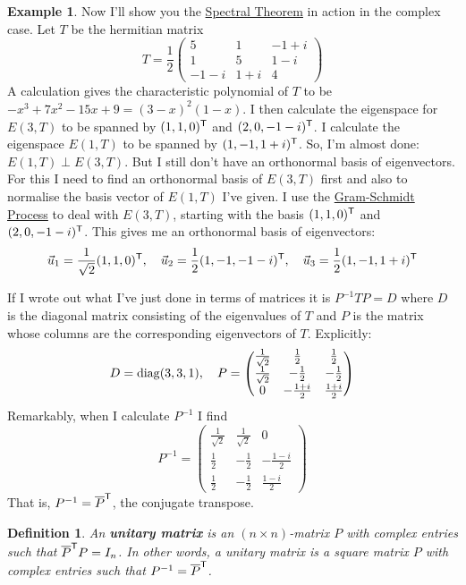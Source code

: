\documentclass[11pt]{amsbook}
\newtheorem{definition}[theorem]{Definition}
\theoremstyle{definition}
\newtheorem{ex}[theorem]{Example}
\begin{document}
\begin{ex} Now I'll show you the \hyperref[spectral]{Spectral Theorem} in action in the complex case. Let $T$ be the hermitian matrix $$T = \frac{1}{2} \begin{pmatrix} 5  & 1 & -1 + i \\ 1 & {5}  & 1 - i \\ -1 - i & 1+i & 4 \end{pmatrix} $$ A calculation gives the characteristic polynomial of $T$ to be $- x^3 + 7x^2 - 15x + 9 = (3-x)^2(1-x)$.  I then calculate the eigenspace for $E(3,T)$ to be spanned by $(1,1,0)^{\sf T}$ and $(2,0,-1-i)^{\sf T}$. I calculate the eigenspace $E(1,T)$ to be spanned by $( 1,-1,1+i)^{\sf T}$. So, I'm almost done: $E(1,T)\perp E(3,T)$. But I still don't have an orthonormal basis of eigenvectors. For this I need to find an orthonormal basis of $E(3,T)$ first and also to normalise the basis vector of $E(1,T)$ I've given. I use the \hyperref[GS]{Gram-Schmidt Process} to deal with $E(3,T)$, starting with the basis $(1,1,0)^{\sf T}$ and $(2,0,-1-i)^{\sf T}$. This gives me an orthonormal basis of eigenvectors: $$\vec{u}_1 = \frac{1}{\sqrt{2}}(1,1,0)^{\sf T}, \quad \vec{u}_2 = \frac{1}{2}(1,-1,-1-i)^{\sf T}, \quad \vec{u}_3 = \frac{1}{2}(1,-1,1+i)^{\sf T}$$

If I wrote out what I've just done in terms of matrices it is $P^{-1}TP = D$ where $D$ is the diagonal matrix consisting of the eigenvalues of $T$ and $P$ is the matrix whose columns are the corresponding eigenvectors of $T$. Explicitly: $$ D = {\rm diag}(3,3,1), \quad P = \begin{pmatrix} \frac{1}{\sqrt{2}} & \frac{1}{2} & \frac{1}{2} \\ \frac{1}{\sqrt{2}} & -\frac{1}{2} & -\frac{1}{2} \\ 0 & -\frac{1+i}{2} & \frac{ 1+i}{2}\end{pmatrix} $$
Remarkably, when I calculate $P^{-1}$ I find $$  P^{-1} = \begin{pmatrix} \frac{1}{\sqrt{2}} & \frac{1}{\sqrt{2}} & 0 \\ \frac{1}{2} & - \frac{1}{{2}} & -\frac{1-i}{2} \\ \frac{1}{2} & -\frac{1}{2} & \frac{ 1-i}{2} \end{pmatrix} $$  That is, $P^{-1} = \overline{P}^{\sf T}$, the conjugate transpose.
\end{ex}

\begin{definition}
An {\bf unitary matrix} is an $(n\times n)$-matrix $P$ with complex entries such that $\overline{P}^{\sf T}P = I_n$. In other words, a unitary matrix is a square matrix $P$ with complex entries such that $P^{-1} = \overline{P}^{\sf T}$.
\end{definition}
\end{document}
